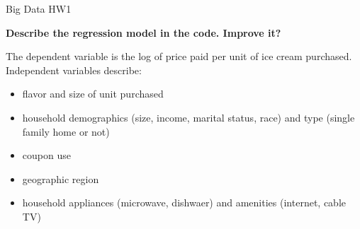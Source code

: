 \documentclass[11pt, fleqn]{article}
\begin{document}
Big Data HW1

\textbf{Describe the regression model in the code. Improve it?}

The dependent variable is the log of price paid per unit of ice cream purchased. Independent variables describe:
\begin{itemize}
  \item flavor and size of unit purchased
  \item household demographics (size, income, marital status, race) and type (single family home or not)
  \item coupon use
  \item geographic region
  \item household appliances (microwave, dishwaer) and amenities (internet, cable TV)
\end{itemize}
\end{document}

